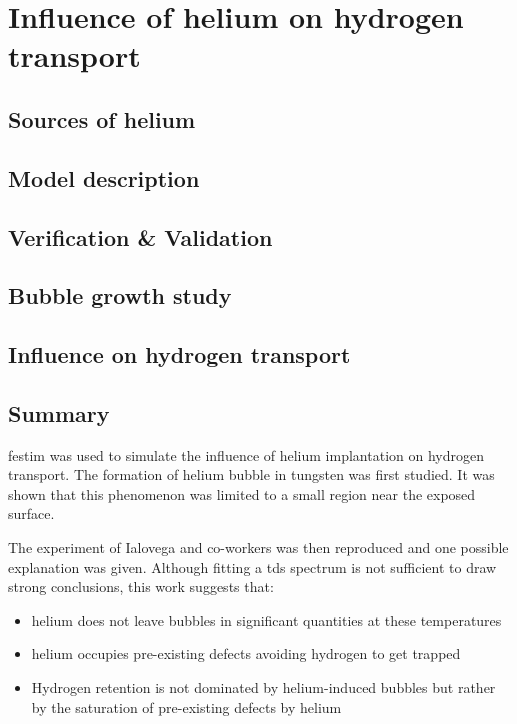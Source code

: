 \setchapterpreamble[u]{\margintoc}
\chapter{Influence of helium on hydrogen transport}
\label{Chapter5} %



\section{Sources of helium}


\section{Model description}


\section{Verification \& Validation}


\section{Bubble growth study}


\section{Influence on hydrogen transport}


\section{Summary}

\gls{festim} was used to simulate the influence of helium implantation on hydrogen transport.
The formation of helium bubble in tungsten was first studied.
It was shown that this phenomenon was limited to a small region near the exposed surface.

The experiment of Ialovega and co-workers  was then reproduced and one possible explanation was given.
Although fitting a \gls{tds} spectrum is not sufficient to draw strong conclusions, this work suggests that:
\begin{itemize}
    \item helium does not leave bubbles in significant quantities at these temperatures
    \item helium occupies pre-existing defects avoiding hydrogen to get trapped
    \item Hydrogen retention is not dominated by helium-induced bubbles but rather by the saturation of pre-existing defects by helium
\end{itemize}

